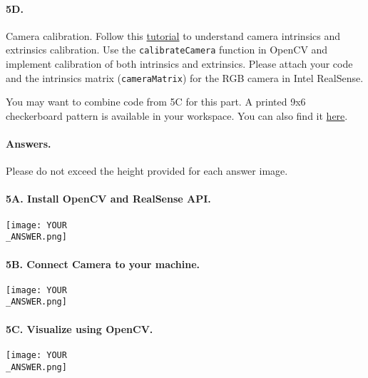 \paragraph{5D.} Camera calibration.
Follow this \href{https://docs.opencv.org/3.4/dc/dbb/tutorial_py_calibration.html}{tutorial} to understand camera intrinsics and extrinsics calibration.
Use the \texttt{calibrateCamera} function in OpenCV and implement calibration of both intrinsics and extrinsics.
Please attach your code and the intrinsics matrix (\texttt{cameraMatrix}) for the RGB camera in Intel RealSense.

You may want to combine code from 5C for this part.
A printed 9x6 checkerboard pattern is available in your workspace.
You can also find it \href{https://drive.google.com/file/d/1Hk-U4xiAmZnrf3qGziQWBW7YbEMFTWgY/view?usp=sharing}{here}.
 
\newpage
\paragraph{Answers.}
Please do not exceed the height provided for each answer image.


\paragraph{5A. Install OpenCV and RealSense API.}
\begin{center}
    \texttt{[image: YOUR\\\_ANSWER.png]}
\end{center}

\paragraph{5B. Connect Camera to your machine.}
\begin{center}
    \texttt{[image: YOUR\\\_ANSWER.png]}
\end{center}

\newpage
\paragraph{5C. Visualize using OpenCV.}
\begin{center}
    \texttt{[image: YOUR\\\_ANSWER.png]}
\end{center}

